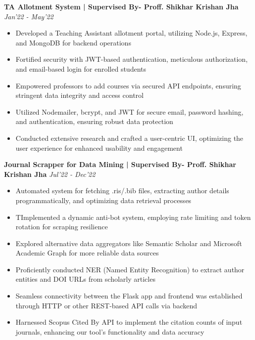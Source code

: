 \documentclass[10pt]{extarticle}
\begin{document}
{\begin{flushleft}
\begin{tcolorbox}[center, width=20.7cm, colback=black!10]
\textbf{TA Allotment System | Supervised By- Proff. Shikhar Krishan Jha}  \hfill\hfill\textcolor{black!80}{\small \textit{Jan'22 - May'22}}
\end{tcolorbox}
\vspace{-10pt}
\begin{itemize}
\vspace{2.0mm}
    \item Developed a Teaching Assistant allotment portal, utilizing Node.js, Express, and MongoDB for backend operations
    \item Fortified security with JWT-based authentication, meticulous authorization, and email-based login for enrolled students
    \item Empowered professors to add courses via secured API endpoints, ensuring stringent data integrity and access control
    \item Utilized Nodemailer, bcrypt, and JWT for secure email, password hashing, and authentication, ensuring robust data protection
    \item Conducted extensive research and crafted a user-centric UI, optimizing the user experience for enhanced usability and engagement
\end{itemize}
\begin{tcolorbox}[center, width=20.7cm, colback=black!10]
\textbf{Journal Scrapper for Data Mining | Supervised By- Proff. Shikhar Krishan Jha}  \hfill\hfill\textcolor{black!80}{\small \textit{Jul'22 - Dec'22}}
\end{tcolorbox}
\vspace{-10pt}
\begin{itemize}
\vspace{2.0mm}
    \item Automated system for fetching .ris/.bib files, extracting author details programmatically, and optimizing data retrieval processes
    \item TImplemented a dynamic anti-bot system, employing rate limiting and token rotation for scraping resilience
    \item Explored alternative data aggregators like Semantic Scholar and Microsoft Academic Graph for more reliable data sources
\item Proficiently conducted NER (Named Entity Recognition) to extract author entities and DOI URLs from scholarly articles
    \item Seamless connectivity between the Flask app and frontend was established through HTTP or other REST-based API calls via backend
    \item Harnessed Scopus Cited By API to implement the citation counts of input journals, enhancing our tool's functionality and data accuracy

\end{itemize}
\end{flushleft}}
\end{document}
